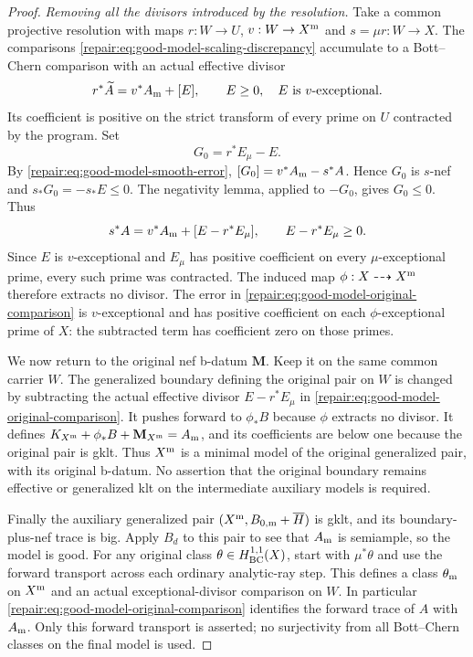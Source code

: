 \begin{proof}
\smallskip\noindent
\emph{Removing all the divisors introduced by the resolution.}
Take a common projective resolution with maps
$r:W\to U$, $v:W\to X^{\rm m}$ and $s=\mu r:W\to X$.
The comparisons \eqref{repair:eq:good-model-scaling-discrepancy} accumulate
to a Bott--Chern comparison with an actual effective divisor
\[
 r^*\widetilde A=v^*A_{\rm m}+[E],
 \qquad E\geq0,\quad E\text{ is }v\text{-exceptional}.
\]
Its coefficient is positive on the strict transform of every prime
on $U$ contracted by the program. Set
\[
                       G_0=r^*E_\mu-E.
\]
By \eqref{repair:eq:good-model-smooth-error},
$[G_0]=v^*A_{\rm m}-s^*A$. Hence $G_0$ is $s$-nef and
$s_*G_0=-s_*E\leq0$. The negativity lemma, applied to $-G_0$,
gives $G_0\leq0$. Thus
\begin{equation}\label{repair:eq:good-model-original-comparison}
 s^*A=v^*A_{\rm m}+[E-r^*E_\mu],
 \qquad E-r^*E_\mu\geq0.
\end{equation}
Since $E$ is $v$-exceptional and $E_\mu$ has positive coefficient on
every $\mu$-exceptional prime, every such prime was contracted.
The induced map $\phi:X\dashrightarrow X^{\rm m}$ therefore
extracts no divisor. The error in
\eqref{repair:eq:good-model-original-comparison} is $v$-exceptional and
has positive coefficient on each $\phi$-exceptional prime of $X$:
the subtracted term has coefficient zero on those primes.

We now return to the original nef b-datum $\mathbf M$. Keep it on
the same common carrier $W$. The generalized boundary defining the
original pair on $W$ is changed by subtracting the actual effective
divisor $E-r^*E_\mu$ in
\eqref{repair:eq:good-model-original-comparison}. It pushes forward to
$\phi_*B$ because $\phi$ extracts no divisor. It defines
$K_{X^{\rm m}}+\phi_*B+\mathbf M_{X^{\rm m}}=A_{\rm m}$, and
its coefficients are below one because the original pair is gklt.
Thus $X^{\rm m}$ is a minimal model of the original generalized
pair, with its original b-datum. No assertion that the original
boundary remains effective or generalized klt on the intermediate
auxiliary models is required.

Finally the auxiliary generalized pair
$(X^{\rm m},B_{0,\rm m}+\overline H)$ is gklt, and its
boundary-plus-nef trace is big. Apply $B_d$ to this pair to see that
$A_{\rm m}$ is semiample, so the model is good. For any original
class $\theta\in H^{1,1}_{\rm BC}(X)$, start with $\mu^*\theta$
and use the forward transport across each ordinary analytic-ray
step. This defines a class $\theta_{\rm m}$ on $X^{\rm m}$ and
an actual exceptional-divisor comparison on $W$. In particular
\eqref{repair:eq:good-model-original-comparison} identifies the forward
trace of $A$ with $A_{\rm m}$. Only this forward transport is
asserted; no surjectivity from all Bott--Chern classes on the final
model is used.
\end{proof}



